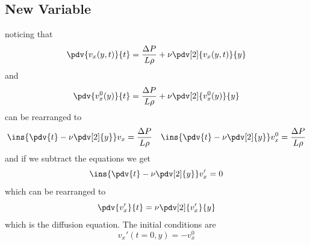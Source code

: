 \subsection{New Variable}
noticing that 
\begin{equation}
	\pdv{v_x(y,t)}{t}=\frac{\Delta P}{L\rho}+\nu\pdv[2]{v_x(y,t)}{y} 
\end{equation}
and 
\begin{equation}
	\pdv{v_x^0(y)}{t}=\frac{\Delta P}{L\rho}+\nu\pdv[2]{v_x^0(y)}{y}
\end{equation}
can be rearranged to 
\begin{align}
	\ins{\pdv{t}-\nu\pdv[2]{y}}v_x = \frac{\Delta P}{L\rho} && \ins{\pdv{t}-\nu\pdv[2]{y}}v_x^0 = \frac{\Delta P}{L\rho}
\end{align}
and if we subtract the equations we get 
\begin{equation}
	\ins{\pdv{t}-\nu\pdv[2]{y}}v_x'=0
\end{equation}
which can be rearranged to 
\begin{equation}
	\pdv{v_x'}{t}=\nu\pdv[2]{v_x'}{y}
\end{equation}
which is the diffusion equation. The initial conditions are 
\begin{equation}
	v_x'(t=0,y) = -v_x^0
\end{equation}

